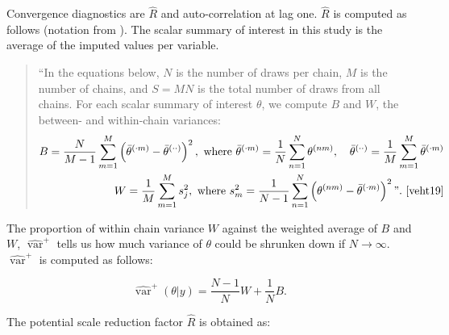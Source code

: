 \documentclass[article]{jss}
\begin{document}

Convergence diagnostics are $\widehat{R}$ and auto-correlation at lag one. $\widehat{R}$ is computed as follows (notation from \cite[p.~5]{veht19}). The scalar summary of interest in this study is the average of the imputed values per variable. %

\begin{quotation}
``In the equations below, $N$ is the number of draws per chain, $M$ is the number of chains, and $S = MN$ is the total number of draws from all chains. For each scalar summary of interest $\theta$, we compute $B$ and $W$, the between- and within-chain variances:
%
\begin{align*}
B=\frac{N}{M-1} \sum_{m=1}^{M}\left(\bar{\theta}^{(\cdot m)}-\bar{\theta}^{(\cdot \cdot)}\right)^{2}, \text { where } \bar{\theta}^{(\cdot m)}=\frac{1}{N} \sum_{n=1}^{N} \theta^{(n m)}, \quad \bar{\theta}^{(\cdot \cdot)}=\frac{1}{M} \sum_{m=1}^{M} \bar{\theta}^{(\cdot m)} \\
W=\frac{1}{M} \sum_{m=1}^{M} s_{j}^{2},  \text { where } s_{m}^{2}=\frac{1}{N-1} \sum_{n=1}^{N}\left(\theta^{(n m)}-\bar{\theta}^{(\cdot m)}\right)^{2}". \text{ \cite[p.~5]{veht19}} 
\end{align*}
%
\end{quotation}

The proportion of within chain variance $W$ against the weighted average of $B$ and $W$, $\widehat{\operatorname{var}}^{+}$ tells us how much variance of $\theta$ could be shrunken down if $N\to\infty$. $\widehat{\operatorname{var}}^{+}$ is computed as follows: %

\begin{equation*}
\widehat{\operatorname{var}}^{+}(\theta | y)=\frac{N-1}{N} W+\frac{1}{N} B.
\end{equation*}

The potential scale reduction factor $\widehat{R}$ is obtained as:
\end{document}
